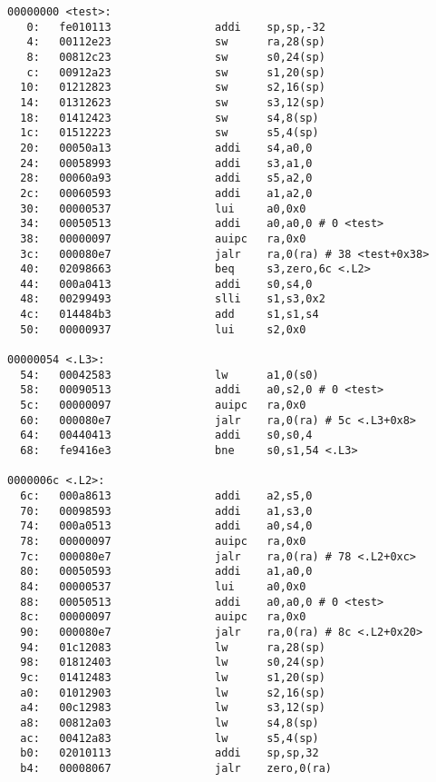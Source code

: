 \begin{Verbatim}[breaklines=true]
00000000 <test>:
   0:   fe010113                addi    sp,sp,-32
   4:   00112e23                sw      ra,28(sp)
   8:   00812c23                sw      s0,24(sp)
   c:   00912a23                sw      s1,20(sp)
  10:   01212823                sw      s2,16(sp)
  14:   01312623                sw      s3,12(sp)
  18:   01412423                sw      s4,8(sp)
  1c:   01512223                sw      s5,4(sp)
  20:   00050a13                addi    s4,a0,0
  24:   00058993                addi    s3,a1,0
  28:   00060a93                addi    s5,a2,0
  2c:   00060593                addi    a1,a2,0
  30:   00000537                lui     a0,0x0
  34:   00050513                addi    a0,a0,0 # 0 <test>
  38:   00000097                auipc   ra,0x0
  3c:   000080e7                jalr    ra,0(ra) # 38 <test+0x38>
  40:   02098663                beq     s3,zero,6c <.L2>
  44:   000a0413                addi    s0,s4,0
  48:   00299493                slli    s1,s3,0x2
  4c:   014484b3                add     s1,s1,s4
  50:   00000937                lui     s2,0x0

00000054 <.L3>:
  54:   00042583                lw      a1,0(s0)
  58:   00090513                addi    a0,s2,0 # 0 <test>
  5c:   00000097                auipc   ra,0x0
  60:   000080e7                jalr    ra,0(ra) # 5c <.L3+0x8>
  64:   00440413                addi    s0,s0,4
  68:   fe9416e3                bne     s0,s1,54 <.L3>

0000006c <.L2>:
  6c:   000a8613                addi    a2,s5,0
  70:   00098593                addi    a1,s3,0
  74:   000a0513                addi    a0,s4,0
  78:   00000097                auipc   ra,0x0
  7c:   000080e7                jalr    ra,0(ra) # 78 <.L2+0xc>
  80:   00050593                addi    a1,a0,0
  84:   00000537                lui     a0,0x0
  88:   00050513                addi    a0,a0,0 # 0 <test>
  8c:   00000097                auipc   ra,0x0
  90:   000080e7                jalr    ra,0(ra) # 8c <.L2+0x20>
  94:   01c12083                lw      ra,28(sp)
  98:   01812403                lw      s0,24(sp)
  9c:   01412483                lw      s1,20(sp)
  a0:   01012903                lw      s2,16(sp)
  a4:   00c12983                lw      s3,12(sp)
  a8:   00812a03                lw      s4,8(sp)
  ac:   00412a83                lw      s5,4(sp)
  b0:   02010113                addi    sp,sp,32
  b4:   00008067                jalr    zero,0(ra)


\end{Verbatim}
